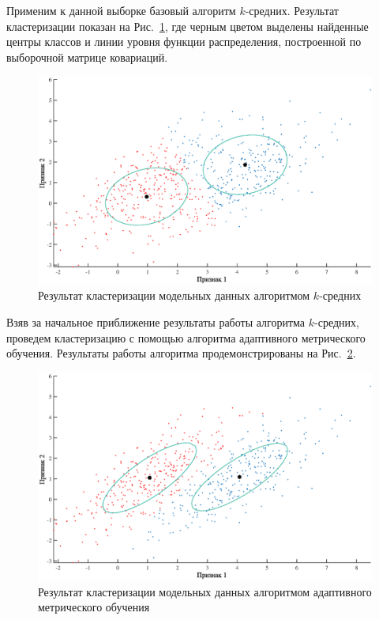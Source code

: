 Применим к данной выборке базовый алгоритм $k$-средних.
Результат кластеризации показан на Рис.~\ref{ch5:fig:kmeans_clustering}, где черным цветом выделены найденные центры классов и линии уровня функции распределения, построенной по выборочной матрице ковариаций.
\begin{figure}[ht]
    \centering
    \includegraphics[width=1\linewidth]{figs/ch5/kmeans_clustering}
    \caption{Результат кластеризации модельных данных алгоритмом $k$-средних}
    \label{ch5:fig:kmeans_clustering}
\end{figure}
Взяв за начальное приближение результаты работы алгоритма $k$-средних,
проведем клас\-те\-ри\-за\-цию с помощью алгоритма адаптивного метрического обучения.
Результаты работы алгоритма продемонстрированы на Рис.~\ref{ch5:fig:AML_clustering}.

\begin{figure}[ht]
    \centering
    \includegraphics[width=1\linewidth]{figs/ch5/AML_clustering}
    \caption{Результат кластеризации модельных данных алгоритмом адаптивного метрического обучения}
    \label{ch5:fig:AML_clustering}
\end{figure}

